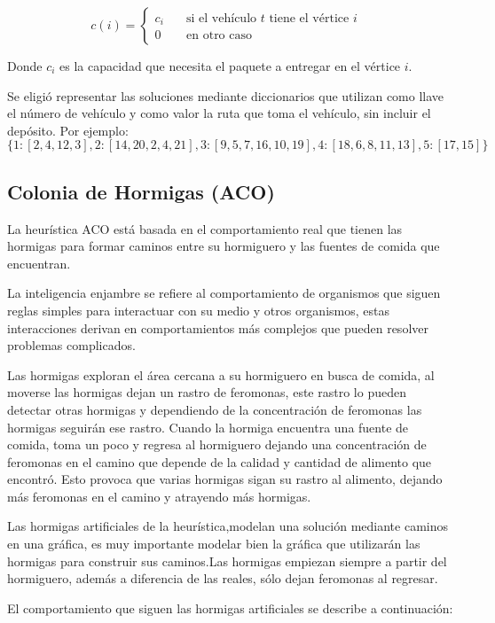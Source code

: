 \documentclass[12pt]{article}
\begin{document}
	\[c(i)=
	\begin{cases}
		c_i&\quad\text{si el vehículo $t$ tiene el vértice $i$ }\\
		0 & \quad\text{en otro caso}
	\end{cases}\]

	Donde $c_i$ es la capacidad que necesita el paquete a entregar en el vértice $i$.
	
	Se eligió representar las soluciones mediante diccionarios que utilizan como 
	llave el número de vehículo y como valor la ruta que toma el vehículo, sin 
	incluir el depósito.
	Por ejemplo:
	\[\{1:[2,4,12,3], 2:[14,20,2,4,21], 3:[9,5,7,16,10,19], 4:[18,6,8,11,13], 
	5:[17,15]\}\]
	

	\subsection{Colonia de Hormigas (ACO)}
	
	La heurística ACO está basada en el comportamiento real que tienen las hormigas
	para formar caminos entre su hormiguero y las fuentes de comida que encuentran.
	
	La inteligencia enjambre se refiere al comportamiento de organismos que siguen
	reglas simples para interactuar con su medio y otros organismos, estas 
	interacciones derivan en comportamientos más complejos que pueden resolver 
	problemas complicados.
	
	Las hormigas exploran el área cercana a su hormiguero en busca de comida, al
	moverse las hormigas dejan un rastro de feromonas, este rastro lo pueden detectar
	otras hormigas y dependiendo de la concentración de feromonas las hormigas 
	seguirán ese rastro. Cuando la hormiga encuentra una fuente de comida, toma un 
	poco y regresa al hormiguero dejando una concentración de feromonas en el camino
	que depende de la calidad y cantidad de alimento que encontró.
	Esto provoca que varias hormigas sigan su rastro al alimento, dejando más 
	feromonas en el camino y atrayendo más hormigas.
	
	Las hormigas artificiales de la heurística,modelan una solución mediante caminos
	en una gráfica, es muy importante modelar bien la gráfica  que utilizarán las 
	hormigas para construir sus caminos.Las hormigas empiezan siempre a partir del 
	hormiguero, además a diferencia de las reales, sólo dejan feromonas al regresar.
	
	
	El comportamiento que siguen las hormigas artificiales se describe a 
	continuación:
\end{document}
